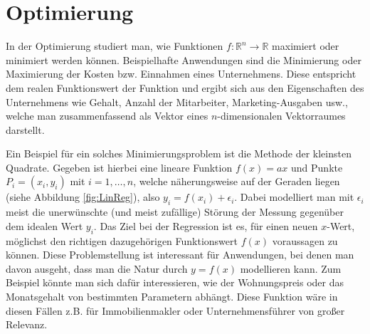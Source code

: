 \section{Optimierung}

In der Optimierung studiert man, wie Funktionen $f: \mathbb{R}^n \rightarrow \mathbb{R}$ maximiert oder minimiert werden können. Beispielhafte Anwendungen sind die Minimierung oder Maximierung der Kosten bzw. Einnahmen eines Unternehmens. Diese entspricht dem realen Funktionswert der Funktion und ergibt sich aus den Eigenschaften des Unternehmens wie Gehalt, Anzahl der Mitarbeiter, Marketing-Ausgaben usw., welche man zusammenfassend als Vektor eines $n$-dimensionalen Vektorraumes darstellt.

\begin{Bsp}
\label{sec:regression}
Ein Beispiel für ein solches Minimierungsproblem ist die Methode der kleinsten Quadrate. Gegeben ist hierbei eine lineare Funktion $f(x) = ax$ und Punkte $P_i=(x_i,y_i)$ mit $i=1,\dots,n$, welche näherungsweise auf der Geraden liegen (siehe Abbildung \ref{fig:LinReg}), also $y_i = f(x_i) + \epsilon_{i}$. Dabei modelliert man mit $\epsilon_i$ meist die unerw\"unschte (und meist zuf\"allige) St\"orung der Messung gegen\"uber dem idealen Wert $y_i$. Das Ziel bei der Regression ist es, f\"ur einen neuen $x$-Wert, m\"oglichst den richtigen dazugeh\"origen Funktionswert $f(x)$ voraussagen zu k\"onnen. Diese Problemstellung ist interessant f\"ur Anwendungen, bei denen man davon ausgeht, dass man die Natur durch $y = f(x)$ modellieren kann. Zum Beispiel k\"onnte man sich daf\"ur interessieren, wie der Wohnungspreis oder das Monatsgehalt von bestimmten Parametern abh\"angt. Diese Funktion w\"are in diesen F\"allen z.B. für Immobilienmakler oder Unternehmensf\"uhrer von gro\ss er Relevanz.
\end{Bsp}


